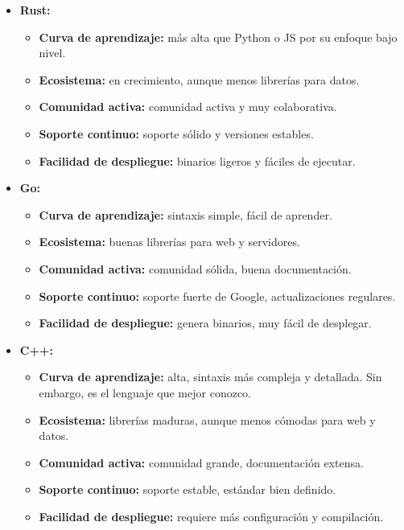 \begin{itemize}
    \item \textbf{Rust: }
    \begin{itemize}
        \item \textbf{Curva de aprendizaje:} más alta que Python
        o JS por su enfoque bajo nivel.
        \item \textbf{Ecosistema:} en crecimiento, aunque menos
        librerías para datos.
        \item \textbf{Comunidad activa:} comunidad activa y
        muy colaborativa.
        \item \textbf{Soporte continuo:} soporte sólido y
        versiones estables.
        \item \textbf{Facilidad de despliegue:} binarios ligeros
        y fáciles de ejecutar.
    \end{itemize}

    \item \textbf{Go: }
    \begin{itemize}
        \item \textbf{Curva de aprendizaje:} sintaxis simple,
        fácil de aprender.
        \item \textbf{Ecosistema:} buenas librerías para web
        y servidores.
        \item \textbf{Comunidad activa:} comunidad sólida,
        buena documentación.
        \item \textbf{Soporte continuo:} soporte fuerte de Google,
        actualizaciones regulares.
        \item \textbf{Facilidad de despliegue:} genera binarios,
        muy fácil de desplegar.
    \end{itemize}

    \item \textbf{C++: }
    \begin{itemize}
        \item \textbf{Curva de aprendizaje:} alta, sintaxis más
        compleja y detallada. Sin embargo, es el lenguaje que 
        mejor conozco.
        \item \textbf{Ecosistema:} librerías maduras, aunque menos
        cómodas para web y datos.
        \item \textbf{Comunidad activa:} comunidad grande,
        documentación extensa.
        \item \textbf{Soporte continuo:} soporte estable,
        estándar bien definido.
        \item \textbf{Facilidad de despliegue:} requiere más
        configuración y compilación.
    \end{itemize}

\end{itemize}

